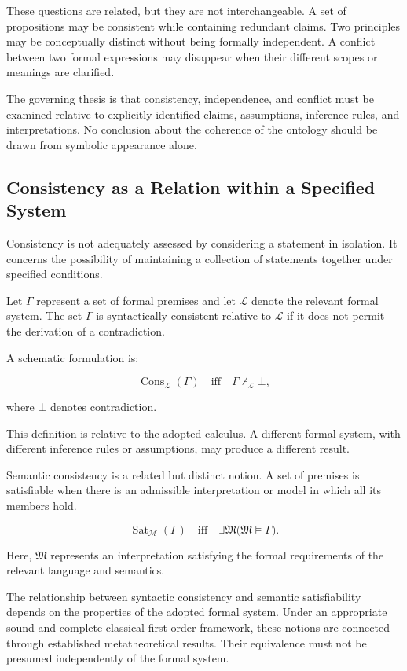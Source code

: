 These questions are related, but they are not interchangeable.
A set of propositions may be consistent while containing
redundant claims. Two principles may be conceptually distinct
without being formally independent. A conflict between two
formal expressions may disappear when their different scopes
or meanings are clarified.

The governing thesis is that consistency, independence, and
conflict must be examined relative to explicitly identified
claims, assumptions, inference rules, and interpretations.
No conclusion about the coherence of the ontology should be
drawn from symbolic appearance alone.

\subsection{Consistency as a Relation within a Specified System}

Consistency is not adequately assessed by considering a
statement in isolation. It concerns the possibility of
maintaining a collection of statements together under specified
conditions.

Let \(\Gamma\) represent a set of formal premises and let
\(\mathcal{L}\) denote the relevant formal system. The set
\(\Gamma\) is syntactically consistent relative to
\(\mathcal{L}\) if it does not permit the derivation of a
contradiction.

A schematic formulation is:

\[
    \operatorname{Cons}_{\mathcal{L}}(\Gamma)
    \quad\text{iff}\quad
    \Gamma \nvdash_{\mathcal{L}} \bot,
\]

where \(\bot\) denotes contradiction.

This definition is relative to the adopted calculus. A different
formal system, with different inference rules or assumptions,
may produce a different result.

Semantic consistency is a related but distinct notion. A set
of premises is satisfiable when there is an admissible
interpretation or model in which all its members hold.

\[
    \operatorname{Sat}_{\mathcal{M}}(\Gamma)
    \quad\text{iff}\quad
    \exists \mathfrak{M}
    \bigl(\mathfrak{M}\models\Gamma\bigr).
\]

Here, \(\mathfrak{M}\) represents an interpretation satisfying
the formal requirements of the relevant language and
semantics.

The relationship between syntactic consistency and semantic
satisfiability depends on the properties of the adopted
formal system. Under an appropriate sound and complete
classical first-order framework, these notions are connected
through established metatheoretical results. Their equivalence
must not be presumed independently of the formal system.

